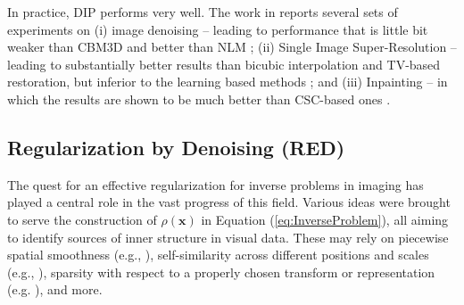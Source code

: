 \documentclass[12pt]{article}
\def\x{{\mathbf x}}
\begin{document}
In practice, DIP performs very well. The work in \cite{DIP-2018} reports several sets of experiments on (i) image denoising -- leading to performance that is little bit weaker than CBM3D \cite{BM3D} and better than NLM \cite{NLM}; (ii) Single Image Super-Resolution -- leading to substantially better results than bicubic interpolation and TV-based restoration, but inferior to the learning based methods \cite{LapSRN,SRresnet}; and (iii) Inpainting -- in which the results are shown to be much better than CSC-based ones \cite{Papyan2017ConvolutionalDL}. 



\subsection{Regularization by Denoising (RED)}
\label{subsec:RED}

The quest for an effective regularization for inverse problems in imaging has played a central role in the vast progress of this field. Various ideas were brought to serve the construction of $\rho(\x)$ in Equation (\ref{eq:InverseProblem}), all aiming to identify sources of inner structure in visual data. These may rely on piecewise spatial smoothness (e.g., \cite{rudin1992nonlinear}), self-similarity across different positions and scales (e.g., \cite{NLM,romano2014single}), 
sparsity with respect to a properly chosen transform or representation (e.g. \cite{BM3D}), and more. 
\end{document}
